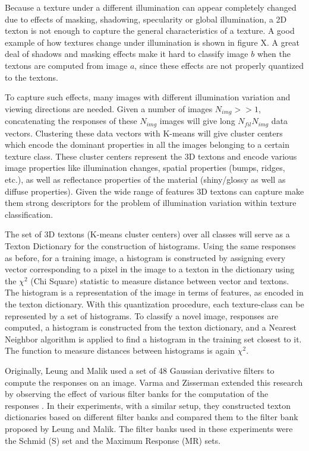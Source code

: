 Because a texture under a different illumination can appear completely changed due to effects of masking, shadowing, specularity or global illumination, a 2D texton is not enough to capture the general characteristics of a texture. A good example of how textures change under illumination is shown in figure X. A great deal of shadows and masking effects make it hard to classify image $b$ when the textons are computed from image $a$, since these effects are not properly quantized to the textons. 

To capture such effects, many images with different illumination variation and viewing directions are needed. Given a number of images $N_{img} >> 1$,  concatenating the responses of these $N_{img}$ images will give long $N_{fil}N_{img}$ data vectors. Clustering these data vectors with K-means will give cluster centers which encode the dominant properties in all the images belonging to a certain texture class. These cluster centers represent the 3D textons and encode various image properties like illumination changes, spatial properties (bumps, ridges, etc.), as well as reflectance properties of the material (shiny/glossy as well as diffuse properties). Given the wide range of features 3D textons can capture make them strong descriptors for the problem of illumination variation within texture classification.

The set of 3D textons (K-means cluster centers) over all classes will serve as a Texton Dictionary for the construction of histograms. Using the same responses as before, for a training image, a histogram is constructed by assigning every vector corresponding to a pixel in the image to a texton in the dictionary using the $\chi^2$ (Chi Square) statistic to measure distance between vector and textons. The histogram is a representation of the image in terms of features, as encoded in the texton dictionary. With this quantization procedure, each texture-class can be represented by a set of histograms. To classify a novel image, responses are computed, a histogram is constructed from the texton dictionary, and a Nearest Neighbor algorithm is applied to find a histogram in the training set closest to it. The function to measure distances between histograms is again $\chi^2$.

Originally, Leung and Malik used a set of 48 Gaussian derivative filters to compute the responses on an image. Varma and Zisserman extended this research by observing the effect of various filter banks for the computation of the responses \cite{VarmaZisserman}. In their experiments, with a similar setup, they constructed texton dictionaries based on different filter banks and compared them to the filter bank proposed by Leung and Malik. The filter banks used in these experiments were the Schmid (S) set and the Maximum Response (MR) sets. 


